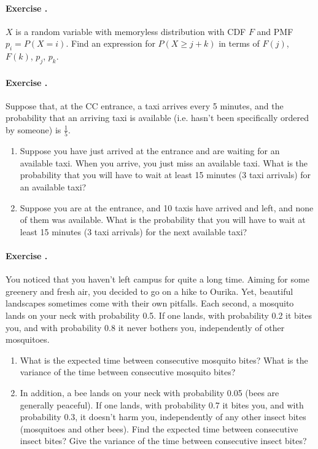 \documentclass[twocolumn,12pt,a4paper]{article}
\newcounter{num}  %
\begin{document}
	\paragraph{Exercise \thenum.}
	$X$ is a random variable with memoryless distribution with CDF $F$ and PMF $p_i = P(X = i)$.
	Find an expression for $P(X \geq j + k)$ in terms of $F(j)$, $F(k)$, $p_j$, $p_k$.
	
	

\paragraph{Exercise \thenum.}
Suppose that, at the CC entrance, a taxi arrives every 5 minutes, and the	probability that an arriving taxi is available (i.e. hasn't been specifically ordered by someone) is \( \frac{1}{5} \).
	
	\begin{enumerate}
		\item Suppose you have just arrived at the entrance and are waiting for an available taxi. When you arrive, you just miss an available taxi. 
		What is the probability that you will have to wait at least 15 minutes (3 taxi arrivals) for an available taxi?
		
		
		\item Suppose you are at the entrance, and 10 taxis have arrived and left, and none of them was available. What is the probability that you will have to wait at least 15 minutes (3 taxi arrivals) for the next available taxi?
	\end{enumerate}
	
	
	\paragraph{Exercise \thenum.}
You noticed that you haven't left campus for quite a long time.
Aiming for some greenery and fresh air, you decided to go on a hike to Ourika. 
Yet, beautiful landscapes sometimes come with their own pitfalls.
Each second, a mosquito lands on your neck with probability 0.5. If one lands, with probability 0.2 it bites you, and with probability 0.8 it never bothers you, independently of other mosquitoes.

\begin{enumerate}
	\item What is the expected time between consecutive mosquito bites? What is the variance of the time between consecutive mosquito bites?
	
	\item In addition, a bee lands on your neck with probability 0.05 (bees are generally peaceful). If one lands, with probability 0.7 it bites you, and with probability 0.3, it doesn't harm you, independently of any other insect bites (mosquitoes and other bees). 
	Find the expected time between consecutive insect bites? 
	Give the variance of the time between consecutive insect bites?
\end{enumerate}
\end{document}
